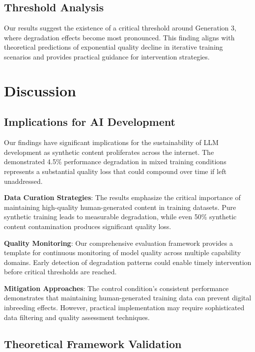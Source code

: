\documentclass{article}
\begin{document}
\subsection{Threshold Analysis}

Our results suggest the existence of a critical threshold around Generation 3, where degradation effects become most pronounced. This finding aligns with theoretical predictions of exponential quality decline in iterative training scenarios and provides practical guidance for intervention strategies.

\section{Discussion}

\subsection{Implications for AI Development}

Our findings have significant implications for the sustainability of LLM development as synthetic content proliferates across the internet. The demonstrated 4.5\% performance degradation in mixed training conditions represents a substantial quality loss that could compound over time if left unaddressed.

\textbf{Data Curation Strategies}: The results emphasize the critical importance of maintaining high-quality human-generated content in training datasets. Pure synthetic training leads to measurable degradation, while even 50\% synthetic content contamination produces significant quality loss.

\textbf{Quality Monitoring}: Our comprehensive evaluation framework provides a template for continuous monitoring of model quality across multiple capability domains. Early detection of degradation patterns could enable timely intervention before critical thresholds are reached.

\textbf{Mitigation Approaches}: The control condition's consistent performance demonstrates that maintaining human-generated training data can prevent digital inbreeding effects. However, practical implementation may require sophisticated data filtering and quality assessment techniques.

\subsection{Theoretical Framework Validation}
\end{document}
